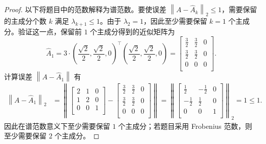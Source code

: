 \begin{proof}
以下将题目中的范数解释为谱范数。要使误差 $\left\|A - \hat{A}_k\right\|_2 \le 1$，需要保留的主成分个数 $k$ 满足 $\lambda_{k+1} \le 1$。由于 $\lambda_2 = 1$，因此至少需要保留 $k = 1$ 个主成分。验证这一点，保留前 $1$ 个主成分得到的近似矩阵为 \[\hat{A}_1 = 3 \cdot \left(\frac{\sqrt{2}}{2}, \frac{\sqrt{2}}{2}, 0\right)^\top \left(\frac{\sqrt{2}}{2}, \frac{\sqrt{2}}{2}, 0\right) = \begin{bmatrix}
    \frac{3}{2} & \frac{3}{2} & 0 \\
    \frac{3}{2} & \frac{3}{2} & 0 \\
    0 & 0 & 0 \\
\end{bmatrix}.\]
计算误差 $\left\|A - \hat{A}_1\right\|$ 有
\[\begin{aligned}
    \left\|A - \hat{A}_1\right\|_2 &= \left\|\begin{bmatrix}
    2 & 1 & 0 \\
    1 & 2 & 0 \\
    0 & 0 & 1 \\
\end{bmatrix} - \begin{bmatrix}
    \frac{3}{2} & \frac{3}{2} & 0 \\
    \frac{3}{2} & \frac{3}{2} & 0 \\
    0 & 0 & 0 \\
\end{bmatrix}\right\| = \left\|\begin{bmatrix}
    \frac{1}{2} & -\frac{1}{2} & 0 \\
    -\frac{1}{2} & \frac{1}{2} & 0 \\
    0 & 0 & 1 \\
\end{bmatrix}\right\|_2 = 1 \le 1.
\end{aligned}
\]
因此在谱范数意义下至少需要保留 $\boxed{1}$ 个主成分；若题目采用 Frobenius 范数，则至少需要保留 $2$ 个主成分。

\end{proof}
